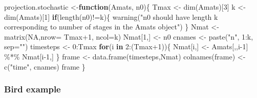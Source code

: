 \documentclass[
]{book}
\newenvironment{Shaded}{\begin{snugshade}}{\end{snugshade}}
\newcommand{\AttributeTok}[1]{\textcolor[rgb]{0.77,0.63,0.00}{#1}}
\newcommand{\ConstantTok}[1]{\textcolor[rgb]{0.00,0.00,0.00}{#1}}
\newcommand{\ControlFlowTok}[1]{\textcolor[rgb]{0.13,0.29,0.53}{\textbf{#1}}}
\newcommand{\DecValTok}[1]{\textcolor[rgb]{0.00,0.00,0.81}{#1}}
\newcommand{\FunctionTok}[1]{\textcolor[rgb]{0.00,0.00,0.00}{#1}}
\newcommand{\NormalTok}[1]{#1}
\newcommand{\OtherTok}[1]{\textcolor[rgb]{0.56,0.35,0.01}{#1}}
\newcommand{\SpecialCharTok}[1]{\textcolor[rgb]{0.00,0.00,0.00}{#1}}
\newcommand{\StringTok}[1]{\textcolor[rgb]{0.31,0.60,0.02}{#1}}
\begin{document}
\begin{Shaded}
\begin{Highlighting}[]
\NormalTok{projection.stochastic }\OtherTok{\textless{}{-}}\ControlFlowTok{function}\NormalTok{(Amats, n0)\{}
\NormalTok{    Tmax }\OtherTok{\textless{}{-}} \FunctionTok{dim}\NormalTok{(Amats)[}\DecValTok{3}\NormalTok{]}
\NormalTok{    k }\OtherTok{\textless{}{-}} \FunctionTok{dim}\NormalTok{(Amats)[}\DecValTok{1}\NormalTok{]}
    \ControlFlowTok{if}\NormalTok{(}\FunctionTok{length}\NormalTok{(n0)}\SpecialCharTok{!=}\NormalTok{k)\{}
      \FunctionTok{warning}\NormalTok{(}\StringTok{"n0 should have length k corresponding to number of stages in the Amats object"}\NormalTok{)}
\NormalTok{      \}}
\NormalTok{    Nmat }\OtherTok{\textless{}{-}} \FunctionTok{matrix}\NormalTok{(}\ConstantTok{NA}\NormalTok{,}\AttributeTok{nrow=}\NormalTok{ Tmax}\SpecialCharTok{+}\DecValTok{1}\NormalTok{, }\AttributeTok{ncol=}\NormalTok{k)}
\NormalTok{    Nmat[}\DecValTok{1}\NormalTok{,] }\OtherTok{\textless{}{-}}\NormalTok{ n0}
\NormalTok{  cnames }\OtherTok{\textless{}{-}} \FunctionTok{paste}\NormalTok{(}\StringTok{"n"}\NormalTok{, }\DecValTok{1}\SpecialCharTok{:}\NormalTok{k, }\AttributeTok{sep=}\StringTok{""}\NormalTok{)}
\NormalTok{  timesteps }\OtherTok{\textless{}{-}} \DecValTok{0}\SpecialCharTok{:}\NormalTok{Tmax}
    \ControlFlowTok{for}\NormalTok{(i }\ControlFlowTok{in} \DecValTok{2}\SpecialCharTok{:}\NormalTok{(Tmax}\SpecialCharTok{+}\DecValTok{1}\NormalTok{))\{  }
\NormalTok{        Nmat[i,] }\OtherTok{\textless{}{-}}\NormalTok{ Amats[,,i}\DecValTok{{-}1}\NormalTok{] }\SpecialCharTok{\%*\%}\NormalTok{ Nmat[i}\DecValTok{{-}1}\NormalTok{,]}
\NormalTok{        \}}
\NormalTok{  frame }\OtherTok{\textless{}{-}} \FunctionTok{data.frame}\NormalTok{(timesteps,Nmat)}
  \FunctionTok{colnames}\NormalTok{(frame) }\OtherTok{\textless{}{-}} \FunctionTok{c}\NormalTok{(}\StringTok{"time"}\NormalTok{, cnames)}
\NormalTok{  frame}
\NormalTok{\}}
\end{Highlighting}
\end{Shaded}

\hypertarget{bird-example-17}{%
\subsubsection*{Bird example}\label{bird-example-17}}
\end{document}
